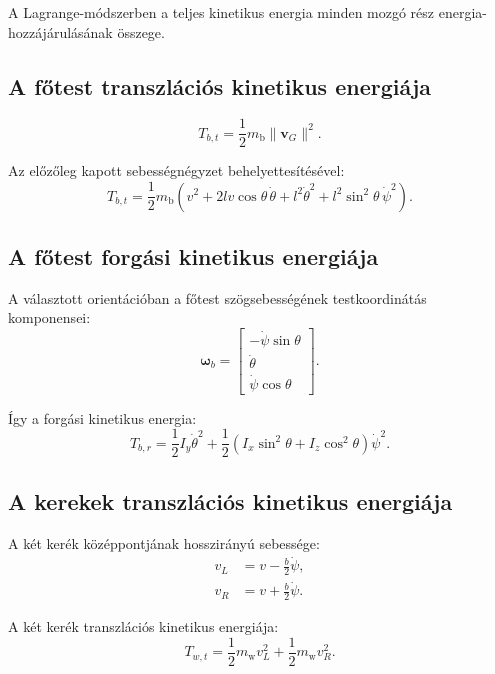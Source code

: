 \documentclass[12pt,a4paper]{article}
\newcommand{\mbody}{m_{\mathrm{b}}}
\newcommand{\mwheel}{m_{\mathrm{w}}}
\begin{document}
	A Lagrange-módszerben a teljes kinetikus energia minden mozgó rész energia-hozzájárulásának összege.
	
	\subsection{A főtest transzlációs kinetikus energiája}
	
	\begin{equation}
		T_{b,t}=\frac{1}{2}\mbody\|\bm v_G\|^2.
	\end{equation}
	
	Az előzőleg kapott sebességnégyzet behelyettesítésével:
	\begin{equation}
		T_{b,t}=\frac{1}{2}\mbody
		\left(
		v^2
		+2lv\cos\theta\,\dot\theta
		+l^2\dot\theta^2
		+l^2\sin^2\theta\,\dot\psi^2
		\right).
	\end{equation}
	
	\subsection{A főtest forgási kinetikus energiája}
	
	A választott orientációban a főtest szögsebességének testkoordinátás komponensei:
	\begin{equation}
		\bm\omega_b=
		\begin{bmatrix}
			-\dot\psi\sin\theta\\
			\dot\theta\\
			\dot\psi\cos\theta
		\end{bmatrix}.
	\end{equation}
	
	Így a forgási kinetikus energia:
	\begin{equation}
		T_{b,r}=
		\frac{1}{2}I_y\dot\theta^2
		+
		\frac{1}{2}
		\left(I_x\sin^2\theta+I_z\cos^2\theta\right)
		\dot\psi^2.
	\end{equation}
	
	\subsection{A kerekek transzlációs kinetikus energiája}
	
	A két kerék középpontjának hosszirányú sebessége:
	\begin{align*}
		v_L &= v-\frac{b}{2}\dot\psi,\\
		v_R &= v+\frac{b}{2}\dot\psi.
	\end{align*}
	
	A két kerék transzlációs kinetikus energiája:
	\begin{equation}
		T_{w,t}=\frac{1}{2}\mwheel v_L^2+
		\frac{1}{2}\mwheel v_R^2.
	\end{equation}
	
\end{document}
